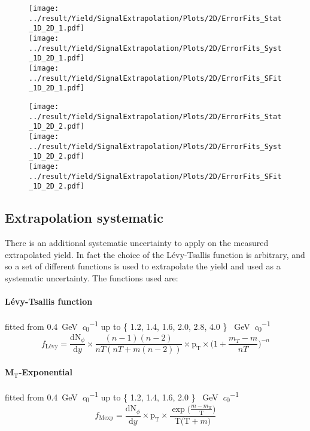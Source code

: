 \begin{figure}
\centering
\texttt{[image: ../result/Yield/SignalExtrapolation/Plots/2D/ErrorFits\_Stat\_1D\_2D\_1.pdf]}\\
\texttt{[image: ../result/Yield/SignalExtrapolation/Plots/2D/ErrorFits\_Syst\_1D\_2D\_1.pdf]}\\
\texttt{[image: ../result/Yield/SignalExtrapolation/Plots/2D/ErrorFits\_SFit\_1D\_2D\_1.pdf]}
\label{fig:Extrap2D_0}
\caption{}
\end{figure}

\begin{figure}
\centering
\texttt{[image: ../result/Yield/SignalExtrapolation/Plots/2D/ErrorFits\_Stat\_1D\_2D\_2.pdf]}\\
\texttt{[image: ../result/Yield/SignalExtrapolation/Plots/2D/ErrorFits\_Syst\_1D\_2D\_2.pdf]}\\
\texttt{[image: ../result/Yield/SignalExtrapolation/Plots/2D/ErrorFits\_SFit\_1D\_2D\_2.pdf]}
\label{fig:Extrap2D_0}
\caption{}
\end{figure}

\subsection{Extrapolation systematic}
There is an additional systematic uncertainty to apply on the measured extrapolated yield. In fact the choice of the L\'evy-Tsallis function is arbitrary, and so a set of different functions is used to extrapolate the yield and used as a systematic uncertainty.
The functions used are:

\paragraph{L\'evy-Tsallis function} fitted from \SI{0.4}{\giga\electronvolt\per\clight} up to \{ 1.2, 1.4, 1.6, 2.0, 2.8, 4.0 \} \SI{}{\giga\electronvolt\per\clight}
\begin{equation}
f_{\text{L\'evy}} = \frac{\text{dN}_{\phi}}{\text{d}y}\times\frac{(n-1)(n-2)}{nT(nT+m(n-2))}\times\text{p}_{\text{T}}\times\Big( 1+ \frac{m_{T} -m}{nT} \Big)^{-n}
\label{eq:levy-tsallis}
\end{equation}

\paragraph{M$_{\text{T}}$-Exponential} fitted from \SI{0.4}{\giga\electronvolt\per\clight} up to \{ 1.2, 1.4, 1.6, 2.0 \} \SI{}{\giga\electronvolt\per\clight}
\begin{equation}
f_{\text{Mexp}} = \frac{\text{dN}_{\phi}}{\text{d}y}\times\text{p}_{\text{T}}\times\frac{\exp\Big(\frac{m-m_{\text{T}}}{\text{T}} \Big)}{\text{T}\Big(\text{T}+m\Big)}
\label{eq:mtexp}
\end{equation}

